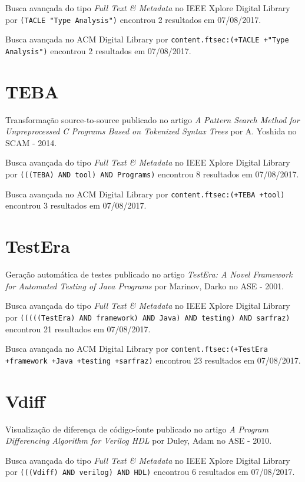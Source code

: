 Busca avançada do tipo {\it Full Text \& Metadata} no IEEE Xplore Digital Library por
\texttt{(TACLE "Type Analysis")}
encontrou
2 resultados em
07/08/2017.

Busca avançada no ACM Digital Library por
\texttt{content.ftsec:(+TACLE +"Type Analysis")}
encontrou
2 resultados em
07/08/2017.

\section{TEBA}

Transformação source-to-source
publicado no artigo
{\it A Pattern Search Method for Unpreprocessed C Programs Based on Tokenized Syntax Trees}
por
A. Yoshida
no
SCAM
-
2014.

Busca avançada do tipo {\it Full Text \& Metadata} no IEEE Xplore Digital Library por
\texttt{(((TEBA) AND tool) AND Programs)}
encontrou
8 resultados em
07/08/2017.

Busca avançada no ACM Digital Library por
\texttt{content.ftsec:(+TEBA +tool)}
encontrou
3 resultados em
07/08/2017.

\section{TestEra}

Geração automática de testes
publicado no artigo
{\it TestEra: A Novel Framework for Automated Testing of Java Programs}
por
Marinov, Darko
no
ASE
-
2001.

Busca avançada do tipo {\it Full Text \& Metadata} no IEEE Xplore Digital Library por
\texttt{(((((TestEra) AND framework) AND Java) AND testing) AND sarfraz)}
encontrou
21 resultados em
07/08/2017.

Busca avançada no ACM Digital Library por
\texttt{content.ftsec:(+TestEra +framework +Java +testing +sarfraz)}
encontrou
23 resultados em
07/08/2017.

\section{Vdiff}

Visualização de diferença de código-fonte
publicado no artigo
{\it A Program Differencing Algorithm for Verilog HDL}
por
Duley, Adam
no
ASE
-
2010.

Busca avançada do tipo {\it Full Text \& Metadata} no IEEE Xplore Digital Library por
\texttt{(((Vdiff) AND verilog) AND HDL)}
encontrou
6 resultados em
07/08/2017.

